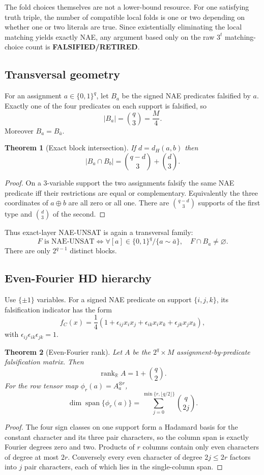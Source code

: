 \documentclass[11pt]{article}
\newtheorem{theorem}{Theorem}
\newcommand{\RET}{\textbf{FALSIFIED/RETIRED}}
\begin{document}
The fold choices themselves are not a lower-bound resource. For one satisfying truth triple, the number of compatible local folds is one or two depending on whether one or two literals are true. Since existentially eliminating the local matching yields exactly NAE, any argument based only on the raw $3^t$ matching-choice count is \RET.

\subsection{Transversal geometry}
For an assignment $a\in\{0,1\}^q$, let $B_a$ be the signed NAE predicates falsified by $a$. Exactly one of the four predicates on each support is falsified, so
\[
|B_a|=\binom q3=\frac{M}{4}.
\]
Moreover $B_a=B_{\bar a}$.

\begin{theorem}[Exact block intersection]
If $d=d_H(a,b)$ then
\[
\boxed{|B_a\cap B_b|=\binom{q-d}{3}+\binom d3.}
\]
\end{theorem}
\begin{proof}
On a 3-variable support the two assignments falsify the same NAE predicate iff their restrictions are equal or complementary. Equivalently the three coordinates of $a\oplus b$ are all zero or all one. There are $\binom{q-d}{3}$ supports of the first type and $\binom d3$ of the second.
\end{proof}

Thus exact-layer NAE-UNSAT is again a transversal family:
\[
F\text{ is NAE-UNSAT}
\iff
\forall [a]\in\{0,1\}^q/\{a\sim\bar a\},\quad
F\cap B_a\ne\varnothing.
\]
There are only $2^{q-1}$ distinct blocks.

\subsection{Even-Fourier HD hierarchy}
Use $\{\pm1\}$ variables. For a signed NAE predicate on support $\{i,j,k\}$, its falsification indicator has the form
\[
f_C(x)=\frac14
\left(
1+\epsilon_{ij}x_ix_j+\epsilon_{ik}x_ix_k+\epsilon_{jk}x_jx_k
\right),
\]
with $\epsilon_{ij}\epsilon_{ik}\epsilon_{jk}=1$.

\begin{theorem}[Even-Fourier rank]
Let $A$ be the $2^q\times M$ assignment-by-predicate falsification matrix. Then
\[
\boxed{\operatorname{rank}_{\mathbb R}A=1+\binom q2.}
\]
For the row tensor map $\phi_r(a)=A_a^{\otimes r}$,
\[
\boxed{
\dim\operatorname{span}\{\phi_r(a)\}
=
\sum_{j=0}^{\min\{r,\lfloor q/2\rfloor\}}\binom q{2j}.
}
\]
\end{theorem}
\begin{proof}
The four sign classes on one support form a Hadamard basis for the constant character and its three pair characters, so the column span is exactly Fourier degrees zero and two. Products of $r$ columns contain only even characters of degree at most $2r$. Conversely every even character of degree $2j\le2r$ factors into $j$ pair characters, each of which lies in the single-column span.
\end{proof}
\end{document}
